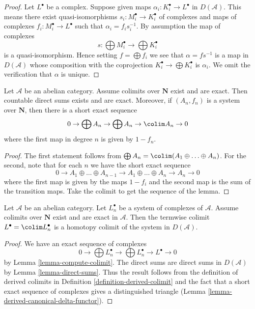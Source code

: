 \begin{proof}
Let $L^\bullet$ be a complex. Suppose given maps
$\alpha_i : K_i^\bullet \to L^\bullet$ in $D(\mathcal{A})$.
This means there exist quasi-isomorphisms
$s_i : M_i^\bullet \to K_i^\bullet$
of complexes and maps of complexes $f_i : M_i^\bullet \to L^\bullet$
such that $\alpha_i = f_is_i^{-1}$. By assumption the map of complexes
$$
s : \bigoplus M_i^\bullet \longrightarrow \bigoplus K_i^\bullet
$$
is a quasi-isomorphism. Hence setting $f = \bigoplus f_i$ we see that
$\alpha = fs^{-1}$ is a map in $D(\mathcal{A})$ whose composition
with the coprojection $K_i^\bullet \to \bigoplus K_i^\bullet$ is $\alpha_i$.
We omit the verification that $\alpha$ is unique.
\end{proof}

\begin{lemma}
\label{lemma-compute-colimit}
Let $\mathcal{A}$ be an abelian category. Assume colimits over $\mathbf{N}$
exist and are exact. Then countable direct sums exists and are exact.
Moreover, if $(A_n, f_n)$ is a system over $\mathbf{N}$, then there is
a short exact sequence
$$
0 \to \bigoplus A_n \to \bigoplus A_n \to \colim A_n \to 0
$$
where the first map in degree $n$ is given by $1 - f_n$.
\end{lemma}

\begin{proof}
The first statement follows from
$\bigoplus A_n = \colim (A_1 \oplus \ldots \oplus A_n)$.
For the second, note that for each $n$ we have the short exact sequence
$$
0 \to
A_1 \oplus \ldots \oplus A_{n - 1} \to
A_1 \oplus \ldots \oplus A_n \to A_n \to 0
$$
where the first map is given by the maps $1 - f_i$ and the
second map is the sum of the transition maps.
Take the colimit to get the sequence of the lemma.
\end{proof}

\begin{lemma}
\label{lemma-colim-hocolim}
Let $\mathcal{A}$ be an abelian category. Let $L_n^\bullet$
be a system of complexes of $\mathcal{A}$. Assume
colimits over $\mathbf{N}$ exist and are exact in $\mathcal{A}$.
Then the termwise
colimit $L^\bullet = \colim L_n^\bullet$ is a homotopy colimit of the
system in $D(\mathcal{A})$.
\end{lemma}

\begin{proof}
We have an exact sequence of complexes
$$
0 \to \bigoplus L_n^\bullet \to \bigoplus L_n^\bullet \to L^\bullet \to 0
$$
by Lemma \ref{lemma-compute-colimit}.
The direct sums are direct sums in $D(\mathcal{A})$ by
Lemma \ref{lemma-direct-sums}.
Thus the result follows from the definition
of derived colimits in
Definition \ref{definition-derived-colimit}
and the fact that a short exact sequence of complexes
gives a distinguished triangle
(Lemma \ref{lemma-derived-canonical-delta-functor}).
\end{proof}

